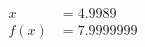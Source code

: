 \documentclass[preview]{standalone}
\begin{document}
\begin{align*}
x &= 4.9989\\f(x) &= 7.9999999
\end{align*}
\end{document}
